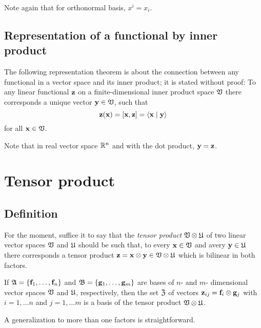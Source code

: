 Note again that for orthonormal basis,
$x^i=x_i$.


\subsection{Representation of a functional by inner product}
\label{2011-m-corr-bil-ip}
The following representation theorem is about the connection between any functional
in a vector space and its inner product; it is stated without proof:
To any linear functional ${\bf z}$
on a finite-dimensional inner product space ${\frak V}$
there corresponds a unique vector   ${\bf y}\in {\frak V}$,
such that
\begin{equation}
{\bf z} ({\bf x}) =[{\bf x}, {\bf z}]= \langle {\bf x}\mid {\bf y}\rangle
\end{equation}
for all ${\bf x}\in {\frak V}$.

Note that in  real vector space ${\Bbb R}^n$ and with the dot product,
 ${\bf y}={\bf z}$.


\section{Tensor product}
\label{2011-m-tensorp}


\subsection{Definition}

For the moment, suffice it to say that
the {\em tensor product}
 ${\frak V} \otimes {\frak U}$
of two linear vector spaces  ${\frak V}$ and  ${\frak U}$
should be such that,
to every
${\bf x} \in  {\frak V}$
and avery
${\bf y} \in  {\frak U}$
there corresponds a tensor product ${\bf z} = {\bf x} \otimes {\bf y}
\in {\frak V} \otimes {\frak U}$
which is bilinear in both factors.

If ${\frak A} =\{{\bf f}_1,\ldots , {\bf f}_n\}$ and
${\frak B} =\{{\bf g}_1,\ldots , {\bf g}_m\}$
are bases of  $n$- and $m$-
dimensional vector spaces ${\frak V}$ and  ${\frak U}$, respectively,
then the set
${\frak Z}$ of vectors ${\bf z}_{ij}= {\bf f}_i \otimes {\bf g}_j$
with $i=1,\ldots n$ and $j=1,\ldots m$
 is a basis of the { tensor product}
 ${\frak V} \otimes {\frak U}$.

A generalization to more than one factors is straightforward.

